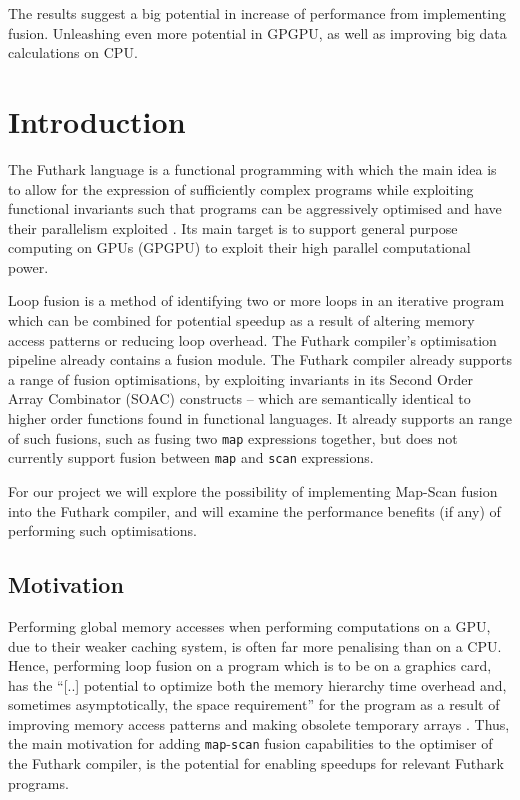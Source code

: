 \documentclass[11pt]{article}
\begin{document}
The results suggest a big potential in increase of performance from implementing fusion. Unleashing even more potential in GPGPU, as well as improving big data calculations on CPU.
\section{Introduction}

The Futhark language is a functional programming with which the main idea is to allow for the expression of sufficiently complex programs while exploiting functional invariants such that
 programs can be aggressively optimised and have their parallelism exploited \cite{futharkdoc}. Its main target is to support general purpose computing on GPUs (GPGPU) to exploit their high parallel
 computational power.

Loop fusion is a method of identifying two or more loops in an iterative program which can be combined for potential speedup as a result of altering memory access patterns  or reducing loop overhead.
 The Futhark compiler's optimisation pipeline already contains a fusion module. 
The Futhark compiler already supports a range of fusion optimisations, by exploiting invariants in its Second Order Array Combinator (SOAC) constructs -- which are semantically identical
 to higher order functions found in functional languages. \cite{T2Fusion} It already supports an range of such fusions, such as fusing two \texttt{map} expressions together,
 but does not currently support fusion between \texttt{map} and \texttt{scan} expressions.

For our project we will explore the possibility of implementing Map-Scan fusion into the Futhark compiler, and will examine the performance benefits (if any) of performing such optimisations.

\subsection{Motivation}
Performing global memory accesses when performing computations on a GPU, due to their weaker caching system, is often far more penalising than on a CPU. Hence, performing loop fusion on a program
 which is to be on a graphics card, has the ``[..] potential to optimize both the memory hierarchy time overhead and, sometimes asymptotically, the space requirement'' for the program as a result of 
improving memory access patterns and making obsolete temporary arrays \cite{T2Fusion}. Thus, the main motivation for adding \texttt{map}-\texttt{scan} fusion capabilities to
 the optimiser of the Futhark compiler, is the potential for enabling speedups for relevant Futhark programs.
\end{document}
